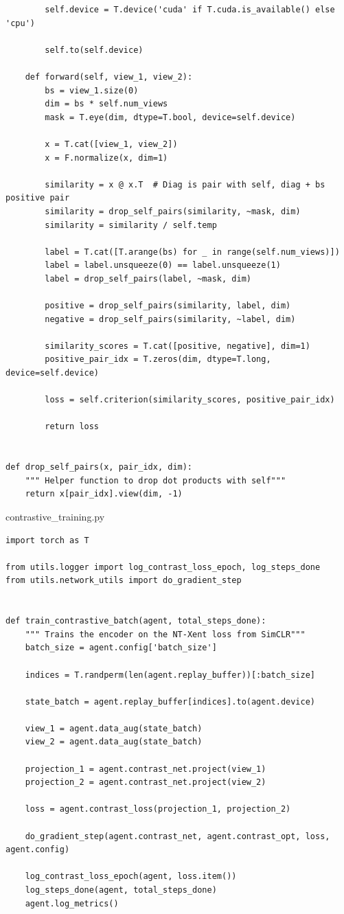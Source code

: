 \documentclass{article}
\begin{document}
\begin{lstlisting}
        self.device = T.device('cuda' if T.cuda.is_available() else 'cpu')

        self.to(self.device)

    def forward(self, view_1, view_2):
        bs = view_1.size(0)
        dim = bs * self.num_views
        mask = T.eye(dim, dtype=T.bool, device=self.device)

        x = T.cat([view_1, view_2])
        x = F.normalize(x, dim=1)

        similarity = x @ x.T  # Diag is pair with self, diag + bs positive pair
        similarity = drop_self_pairs(similarity, ~mask, dim)
        similarity = similarity / self.temp

        label = T.cat([T.arange(bs) for _ in range(self.num_views)])
        label = label.unsqueeze(0) == label.unsqueeze(1)
        label = drop_self_pairs(label, ~mask, dim)

        positive = drop_self_pairs(similarity, label, dim)
        negative = drop_self_pairs(similarity, ~label, dim)

        similarity_scores = T.cat([positive, negative], dim=1)
        positive_pair_idx = T.zeros(dim, dtype=T.long, device=self.device)

        loss = self.criterion(similarity_scores, positive_pair_idx)

        return loss


def drop_self_pairs(x, pair_idx, dim):
    """ Helper function to drop dot products with self"""
    return x[pair_idx].view(dim, -1) 
\end{lstlisting}
\newpage

contrastive\_training.py
\begin{lstlisting}
import torch as T

from utils.logger import log_contrast_loss_epoch, log_steps_done
from utils.network_utils import do_gradient_step


def train_contrastive_batch(agent, total_steps_done):
    """ Trains the encoder on the NT-Xent loss from SimCLR"""
    batch_size = agent.config['batch_size']

    indices = T.randperm(len(agent.replay_buffer))[:batch_size]

    state_batch = agent.replay_buffer[indices].to(agent.device)

    view_1 = agent.data_aug(state_batch)
    view_2 = agent.data_aug(state_batch)

    projection_1 = agent.contrast_net.project(view_1)
    projection_2 = agent.contrast_net.project(view_2)

    loss = agent.contrast_loss(projection_1, projection_2)

    do_gradient_step(agent.contrast_net, agent.contrast_opt, loss, agent.config)

    log_contrast_loss_epoch(agent, loss.item())
    log_steps_done(agent, total_steps_done)
    agent.log_metrics()
\end{lstlisting}
\newpage
\end{document}

